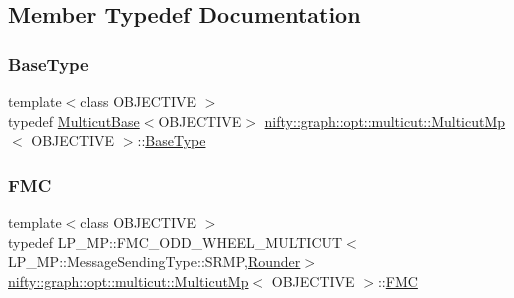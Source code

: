 \subsection{Member Typedef Documentation}
\mbox{\label{classnifty_1_1graph_1_1opt_1_1multicut_1_1MulticutMp_a1d31948dfabbb3c5a3f3523dd9ba23e7}} 
\subsubsection{\texorpdfstring{Base\+Type}{BaseType}}
{\footnotesize\ttfamily template$<$class O\+B\+J\+E\+C\+T\+I\+VE $>$ \\
typedef \hyperlink{classnifty_1_1graph_1_1opt_1_1multicut_1_1MulticutBase}{Multicut\+Base}$<$O\+B\+J\+E\+C\+T\+I\+VE$>$ \hyperlink{classnifty_1_1graph_1_1opt_1_1multicut_1_1MulticutMp}{nifty\+::graph\+::opt\+::multicut\+::\+Multicut\+Mp}$<$ O\+B\+J\+E\+C\+T\+I\+VE $>$\+::\hyperlink{classnifty_1_1graph_1_1opt_1_1multicut_1_1MulticutMp_a1d31948dfabbb3c5a3f3523dd9ba23e7}{Base\+Type}}

\mbox{\label{classnifty_1_1graph_1_1opt_1_1multicut_1_1MulticutMp_a3612b09afe1b53b4a070428a6d565ae4}} 
\subsubsection{\texorpdfstring{F\+MC}{FMC}}
{\footnotesize\ttfamily template$<$class O\+B\+J\+E\+C\+T\+I\+VE $>$ \\
typedef L\+P\+\_\+\+M\+P\+::\+F\+M\+C\+\_\+\+O\+D\+D\+\_\+\+W\+H\+E\+E\+L\+\_\+\+M\+U\+L\+T\+I\+C\+UT$<$L\+P\+\_\+\+M\+P\+::\+Message\+Sending\+Type\+::\+S\+R\+MP,\hyperlink{classnifty_1_1graph_1_1opt_1_1multicut_1_1MulticutMp_a797fe1696d6c09f66835e7899cf3c9fb}{Rounder}$>$ \hyperlink{classnifty_1_1graph_1_1opt_1_1multicut_1_1MulticutMp}{nifty\+::graph\+::opt\+::multicut\+::\+Multicut\+Mp}$<$ O\+B\+J\+E\+C\+T\+I\+VE $>$\+::\hyperlink{classnifty_1_1graph_1_1opt_1_1multicut_1_1MulticutMp_a3612b09afe1b53b4a070428a6d565ae4}{F\+MC}}

